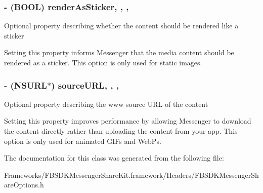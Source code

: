 \subsubsection[{render\+As\+Sticker}]{\setlength{\rightskip}{0pt plus 5cm}-\/ (B\+O\+O\+L) render\+As\+Sticker\hspace{0.3cm}{\ttfamily [read]}, {\ttfamily [write]}, {\ttfamily [nonatomic]}, {\ttfamily [assign]}}\label{interface_f_b_s_d_k_messenger_share_options_ab5153d3741ffa03d1222db0df759275d}
Optional property describing whether the content should be rendered like a sticker

Setting this property informs Messenger that the media content should be rendered as a sticker. This option is only used for static images. \hypertarget{interface_f_b_s_d_k_messenger_share_options_ab571f0b042b3da2b02458b6861a8274e}{}
\subsubsection[{source\+U\+R\+L}]{\setlength{\rightskip}{0pt plus 5cm}-\/ (N\+S\+U\+R\+L$\ast$) source\+U\+R\+L\hspace{0.3cm}{\ttfamily [read]}, {\ttfamily [write]}, {\ttfamily [nonatomic]}, {\ttfamily [copy]}}\label{interface_f_b_s_d_k_messenger_share_options_ab571f0b042b3da2b02458b6861a8274e}
Optional property describing the www source U\+R\+L of the content

Setting this property improves performance by allowing Messenger to download the content directly rather than uploading the content from your app. This option is only used for animated G\+I\+Fs and Web\+Ps. 

The documentation for this class was generated from the following file\+:\begin{DoxyCompactItemize}
\item 
Frameworks/\+F\+B\+S\+D\+K\+Messenger\+Share\+Kit.\+framework/\+Headers/F\+B\+S\+D\+K\+Messenger\+Share\+Options.\+h\end{DoxyCompactItemize}
